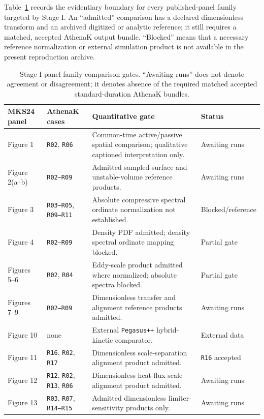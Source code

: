 \documentclass[11pt]{article}
\begin{document}
Table~\ref{tab:comparison-gates} records the evidentiary boundary for every
published-panel family targeted by Stage I.  An ``admitted'' comparison has a
declared dimensionless transform and an archived digitized or analytic
reference; it still requires a matched, accepted AthenaK output bundle.
``Blocked'' means that a necessary reference normalization or external
simulation product is not available in the present reproduction archive.

\begin{table}[htbp]
\centering
\footnotesize
\begin{tabular}{p{}p{}p{}
                p{}}
\toprule
MKS24 panel & AthenaK cases & Quantitative gate & Status \\
\midrule
Figure 1 & \texttt{R02}, \texttt{R06}
  & Common-time active/passive spatial comparison; qualitative captioned
    interpretation only.
  & Awaiting runs \\
Figure 2(a--b) & \texttt{R02--R09}
  & Admitted sampled-surface and unstable-volume reference products.
  & Awaiting runs \\
Figure 3 & \texttt{R03--R05}, \texttt{R09--R11}
  & Absolute compressive spectral ordinate normalization not established.
  & Blocked/reference \\
Figure 4 & \texttt{R02--R09}
  & Density PDF admitted; density spectral ordinate mapping blocked.
  & Partial gate \\
Figures 5--6 & \texttt{R02}, \texttt{R04}
  & Eddy-scale product admitted where normalized; absolute spectra blocked.
  & Partial gate \\
Figures 7--9 & \texttt{R02--R09}
  & Dimensionless transfer and alignment reference products admitted.
  & Awaiting runs \\
Figure 10 & none
  & External \texttt{Pegasus++} hybrid-kinetic comparator.
  & External data \\
Figure 11 & \texttt{R16}, \texttt{R02}, \texttt{R17}
  & Dimensionless scale-separation alignment product admitted.
  & \texttt{R16} accepted \\
Figure 12 & \texttt{R12}, \texttt{R02}, \texttt{R13}, \texttt{R06}
  & Dimensionless heat-flux-scale alignment product admitted.
  & Awaiting runs \\
Figure 13 & \texttt{R03}, \texttt{R07}, \texttt{R14--R15}
  & Admitted dimensionless limiter-sensitivity products only.
  & Awaiting runs \\
\bottomrule
\end{tabular}
\caption{Stage I panel-family comparison gates.  ``Awaiting runs'' does not
denote agreement or disagreement; it denotes absence of the required matched
accepted standard-duration AthenaK bundles.}
\label{tab:comparison-gates}
\end{table}
\end{document}
